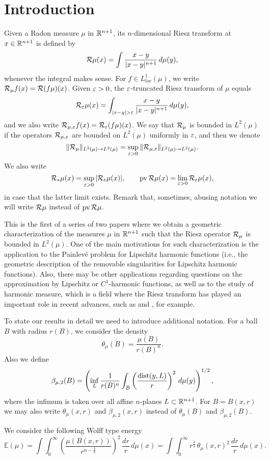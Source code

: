\section{Introduction}

Given a Radon measure $\mu$ in ${\mathbb R}^{n+1}$, its 
$n$-dimensional Riesz transform at $x\in{\mathbb R}^{n+1}$ is defined by
$${\mathcal R}\mu (x) = \int \frac{x-y}{|x-y|^{n+1}}\,d\mu(y),$$
whenever the integral makes sense. For $f\in L^1_{loc}(\mu)$,
we write ${\mathcal R}_\mu f(x) = {\mathcal R}(f\mu)(x)$.
Given ${\varepsilon}>0$, the ${\varepsilon}$-truncated Riesz transform of $\mu$ equals
$$\RR_\ve\mu (x) = \int_{|x-y|>\ve} \frac{x-y}{|x-y|^{n+1}}\,d\mu(y),$$
and we also write ${\mathcal R}_{\mu,{\varepsilon}}f(x) = {\mathcal R}_{\varepsilon}(f\mu)(x)$. We say that ${\mathcal R}_\mu$ is bounded in $L^2(\mu)$ if
the operators ${\mathcal R}_{\mu,{\varepsilon}}$ are bounded on $L^2(\mu)$ uniformly in ${\varepsilon}$, and then we denote
$$\|{\mathcal R}_\mu\|_{L^2(\mu)\to L^2(\mu)} = \sup_{{\varepsilon}>0} \|{\mathcal R}_{\mu,{\varepsilon}}\|_{L^2(\mu)\to L^2(\mu)}.$$
We also write
$${\mathcal R}_*\mu(x) = \sup_{{\varepsilon}>0} |{\mathcal R}_{{\varepsilon}}\mu(x)|, \qquad  \operatorname{pv}{\mathcal R}\mu(x) = \lim_{{\varepsilon}>0} {\mathcal R}_{{\varepsilon}}\mu(x),$$
in case that the latter limit exists. Remark that, sometimes, abusing notation we will
write ${\mathcal R}\mu$ instead of $\operatorname{pv}{\mathcal R}\mu$.

This is the first of a series of two papers where we obtain a geometric characterization
of the measures $\mu$ in ${\mathbb R}^{n+1}$ such that 
the Riesz operator ${\mathcal R}_\mu$ is bounded in $L^2(\mu)$. 
One of the main motivations for such characterization is the application to the Painlev\'e problem for Lipschitz harmonic functions (i.e., the geometric description of the removable singularities for
Lipschitz harmonic functions).  Also, there may be other
applications regarding 
questions on the approximation by Lipschitz or $C^1$-harmonic functions, as well as to
the study of harmonic measure, which is a field where the Riesz transform has played an important role in recent advances, such as \cite{AHM3TV} and \cite{AMTV}, for example.


To state our results in detail we need
to introduce additional notation.
For a ball $B$ with radius $r(B)$, we consider the density 
$$\theta_\mu(B)=\frac{\mu(B)}{r(B)^n}.$$
Also we define
$$\beta_{\mu,2}(B) = \left(\inf_L \frac1{r(B)^n}\int_{B} \left(\frac{{\rm dist}(y,L)}r\right)^2\,d\mu(y)
\right)^{1/2},$$
where the infimum is taken over all affine $n$-planes $L\subset{\mathbb R}^{n+1}$.
For $B=B(x,r)$ we may also write $\theta_\mu(x,r)$ and $\beta_{\mu,2}(x,r)$ instead of $\theta_\mu(B)$
and $\beta_{\mu,2}(B)$.

We consider the following Wolff type energy
\begin{equation}\label{eqEmu0}
\mathbb E(\mu) = \int\!\! \int_0^\infty \left(\frac{\mu(B(x,r))}{r^{n-\frac38}}\right)^2\,\frac{dr}r\,d\mu(x)
= \int\!\! \int_0^\infty r^{\frac3{4}}\,\theta_\mu(x,r)^2\,\frac{dr}{r}\,d\mu(x).
\end{equation}


